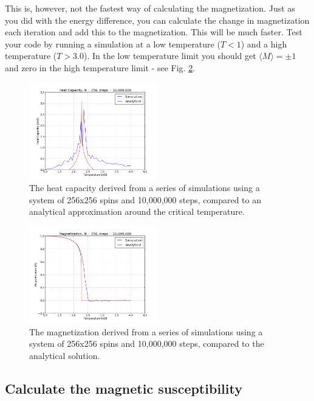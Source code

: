 \documentclass{article}
\begin{document}
This is, however, not the fastest way of calculating the magnetization.
Just as you did with the energy difference, you can calculate the change in magnetization each iteration and
add this to the magnetization. This will be much faster.
Test your code by running a simulation at a low temperature ($T < 1$) and a high temperature ($T > 3.0$).
In the low temperature limit you should get $\langle M \rangle = \pm 1$ and zero in the high temperature limit - see Fig. \ref{fig:magnetization}.

\begin{figure}[p]
  \centering
  \includegraphics[width=0.5\textwidth]{cv_anal.png}
  \caption{The heat capacity derived from a series of simulations using a
  system of 256x256 spins and 10,000,000 steps,
  compared to an analytical approximation around the critical temperature.}
  \label{fig:heat}
\end{figure}


\begin{figure}[p]
  \centering
  \includegraphics[width=0.5\textwidth]{mag_anal.png}
  \caption{The magnetization derived from a series of simulations using a system of
  256x256 spins and 10,000,000 steps, compared to the analytical solution.}
  \label{fig:magnetization}
\end{figure}


\subsection{Calculate the magnetic susceptibility}
\end{document}
